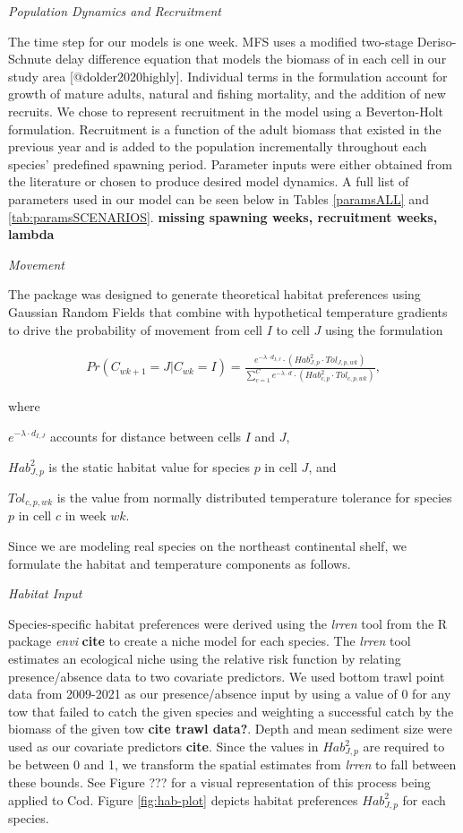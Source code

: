 \documentclass[
  12pt,
]{article}
\begin{document}
\emph{Population Dynamics and Recruitment}

The time step for our models is one week. MFS uses a modified two-stage Deriso-Schnute delay difference equation that models the biomass of in each cell in our study area {[}@dolder2020highly{]}. Individual terms in the formulation account for growth of mature adults, natural and fishing mortality, and the addition of new recruits. We chose to represent recruitment in the model using a Beverton-Holt formulation. Recruitment is a function of the adult biomass that existed in the previous year and is added to the population incrementally throughout each species' predefined spawning period. Parameter inputs were either obtained from the literature or chosen to produce desired model dynamics. A full list of parameters used in our model can be seen below in Tables \ref{paramsALL} and \ref{tab:paramsSCENARIOS}. \textbf{missing spawning weeks, recruitment weeks, lambda}

\emph{Movement}

The package was designed to generate theoretical habitat preferences using Gaussian Random Fields that combine with hypothetical temperature gradients to drive the probability of movement from cell \(I\) to cell \(J\) using the formulation

\begin{align}
Pr(C_{wk+1}=J|C_{wk}=I) = \frac{e^{-\lambda \cdot d_{I,J}}\cdot(Hab^2_{J,p} \cdot Tol_{J,p,wk})}{\sum^C_{c=1}e^{-\lambda \cdot d} \cdot (Hab^2_{c,p} \cdot Tol_{c,p,wk})},
\label{moveP}
\end{align}

where

\(e^{-\lambda \cdot d_{I,J}}\) accounts for distance between cells \(I\) and \(J\),

\(Hab^2_{J,p}\) is the static habitat value for species \(p\) in cell \(J\), and

\(Tol_{c,p,wk}\) is the value from normally distributed temperature tolerance for species \(p\) in cell \(c\) in week \(wk\).

Since we are modeling real species on the northeast continental shelf, we formulate the habitat and temperature components as follows.

\emph{Habitat Input}

Species-specific habitat preferences were derived using the \emph{lrren} tool from the R package \emph{envi} \textbf{cite} to create a niche model for each species. The \emph{lrren} tool estimates an ecological niche using the relative risk function by relating presence/absence data to two covariate predictors. We used bottom trawl point data from 2009-2021 as our presence/absence input by using a value of 0 for any tow that failed to catch the given species and weighting a successful catch by the biomass of the given tow \textbf{cite trawl data?}. Depth and mean sediment size were used as our covariate predictors \textbf{cite}. Since the values in \(Hab^2_{J,p}\) are required to be between 0 and 1, we transform the spatial estimates from \emph{lrren} to fall between these bounds. See Figure ??? for a visual representation of this process being applied to Cod. Figure \ref{fig:hab-plot} depicts habitat preferences \(Hab^2_{J,p}\) for each species.
\end{document}
